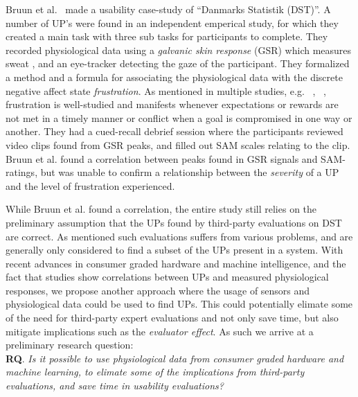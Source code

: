 Bruun et al.~\cite{LH-paper} made a usability case-study of ``Danmarks Statistik (DST)''.
A number of UP's were found in an independent emperical study, for which they created a main task with three sub tasks for participants to complete.
They recorded physiological data using a \textit{galvanic skin response} (GSR) which measures sweat \cite{gsr_calibration}, and an eye-tracker detecting the gaze of the participant.
They formalized a method and a formula for associating the physiological data with the discrete negative affect state \textit{frustration}.
As mentioned in multiple studies, e.g. ~\cite{LH-paper}, ~\cite{frustration_with_computers}, frustration is well-studied
and manifests whenever expectations or rewards are not met in a timely manner or conflict when a goal is compromised in one way or another.
They had a cued-recall debrief session where the participants reviewed video clips found from GSR peaks, and filled out SAM scales relating to the clip. 
Bruun et al. found a correlation between peaks found in GSR signals and SAM-ratings, but was unable to confirm a relationship between the
\textit{severity} of a UP and the level of frustration experienced.

While Bruun et al. found a correlation, the entire study still relies on the preliminary assumption that the UPs found by third-party evaluations on DST are correct. 
As mentioned such evaluations suffers from various problems, and are generally only considered to find a subset of the UPs present in a system. 
With recent advances in consumer graded hardware and machine intelligence, and the fact that studies show correlations between UPs and measured physiological responses, we propose another approach where the usage of sensors and physiological data could be used to find UPs.
This could potentially elimate some of the need for third-party expert evaluations and not only save time, but also mitigate implications such as the \textit{evaluator effect}\cite{eval_effect}.
As such we arrive at a preliminary research question:\\

\textbf{RQ}. \textit{Is it possible to use physiological data from consumer graded hardware and machine learning, to
  elimate some of the implications from third-party evaluations, and save time in usability evaluations?}



